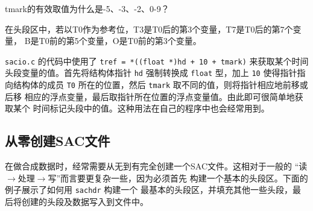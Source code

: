 \begin{note}
tmark的有效取值为什么是-5、-3、-2、0-9？

在头段区中，若以T0作为参考位，T3是T0后的第3个变量，T7是T0后的第7个变量，
B是T0前的第5个变量，O是T0前的第3个变量。

\texttt{sacio.c} 的代码中使用了 \verb|tref = *((float *)hd + 10 + tmark)|
来获取某个时间头段变量的值。首先将结构体指针 \texttt{hd} 强制转换成
\texttt{float} 型，加上 \texttt{10} 使得指针指向结构体的成员 \texttt{T0}
所在的位置，然后 \texttt{tmark} 取不同的值，则将指针相应地前移或后移
相应的浮点变量，最后取指针所在位置的浮点变量值。由此即可很简单地获取某个
时间标记头段中的值。这种用法在自己的程序中也会经常用到。
\end{note}

\subsection{从零创建SAC文件}
在做合成数据时，经常需要从无到有完全创建一个SAC文件。这相对于一般的
``读$\rightarrow$处理$\rightarrow$写''而言要更复杂一些，因为必须首先
构建一个基本的头段区。下面的例子展示了如何用 \texttt{sachdr} 构建一个
最基本的头段区，并填充其他一些头段，最后将创建的头段及数据写入到文件中。
\inputminted{C}{./sacio/write_sac.c}
